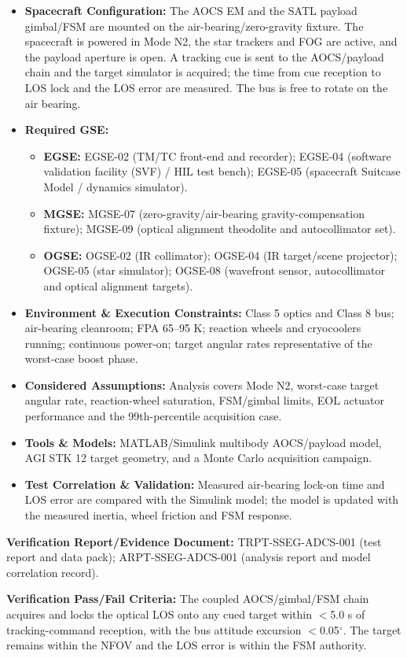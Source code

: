 \begin{itemize}
\item \textbf{Spacecraft Configuration:} The AOCS EM and the SATL payload gimbal/FSM are mounted on the air-bearing/zero-gravity fixture. The spacecraft is powered in Mode N2, the star trackers and FOG are active, and the payload aperture is open. A tracking cue is sent to the AOCS/payload chain and the target simulator is acquired; the time from cue reception to LOS lock and the LOS error are measured. The bus is free to rotate on the air bearing.
\item \textbf{Required GSE:}
\begin{itemize}
\item \textbf{EGSE:} EGSE-02 (TM/TC front-end and recorder); EGSE-04 (software validation facility (SVF) / HIL test bench); EGSE-05 (spacecraft Suitcase Model / dynamics simulator).
\item \textbf{MGSE:} MGSE-07 (zero-gravity/air-bearing gravity-compensation fixture); MGSE-09 (optical alignment theodolite and autocollimator set).
\item \textbf{OGSE:} OGSE-02 (IR collimator); OGSE-04 (IR target/scene projector); OGSE-05 (star simulator); OGSE-08 (wavefront sensor, autocollimator and optical alignment targets).
\end{itemize}
\item \textbf{Environment \& Execution Constraints:} Class 5 optics and Class 8 bus; air-bearing cleanroom; FPA 65--95 K; reaction wheels and cryocoolers running; continuous power-on; target angular rates representative of the worst-case boost phase.
\item \textbf{Considered Assumptions:} Analysis covers Mode N2, worst-case target angular rate, reaction-wheel saturation, FSM/gimbal limits, EOL actuator performance and the 99th-percentile acquisition case.
\item \textbf{Tools \& Models:} MATLAB/Simulink multibody AOCS/payload model, AGI STK 12 target geometry, and a Monte Carlo acquisition campaign.
\item \textbf{Test Correlation \& Validation:} Measured air-bearing lock-on time and LOS error are compared with the Simulink model; the model is updated with the measured inertia, wheel friction and FSM response.
\end{itemize}
\par\textbf{Verification Report/Evidence Document:} TRPT-SSEG-ADCS-001 (test report and data pack); ARPT-SSEG-ADCS-001 (analysis report and model correlation record).
\par\textbf{Verification Pass/Fail Criteria:} The coupled AOCS/gimbal/FSM chain acquires and locks the optical LOS onto any cued target within $<$5.0 s of tracking-command reception, with the bus attitude excursion $<$0.05$^\circ$. The target remains within the NFOV and the LOS error is within the FSM authority.
\par\medskip
